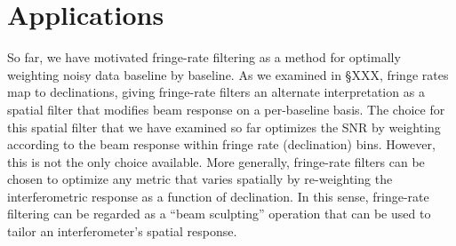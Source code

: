 \documentclass[twocolumn,apj,numberedappendix]{emulateapj}
\begin{document}
%
%

\section{Applications}
\label{sec:bmsculpt}

So far, we have motivated fringe-rate filtering as a method for optimally weighting noisy data baseline by baseline.
As we examined in \S XXX, fringe rates map to declinations, giving fringe-rate filters an alternate interpretation
as a spatial filter that modifies beam response on a per-baseline basis.  The choice for this spatial filter that we
have examined so far optimizes the SNR by weighting according to the beam response within fringe rate (declination) bins.  
However, this is not the only choice available.  More generally, fringe-rate filters can be chosen to optimize
any metric that varies spatially by re-weighting the interferometric response as a function of declination.  In this
sense, fringe-rate filtering can be regarded as a ``beam sculpting'' operation that can be used to tailor an interferometer's
spatial response.
\end{document}
